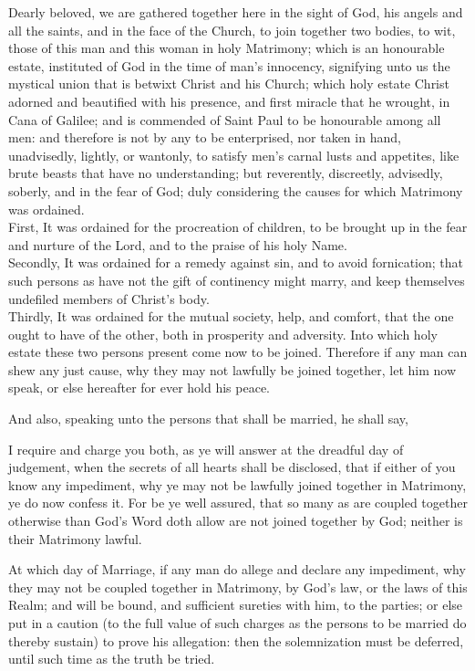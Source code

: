 Dearly beloved, we are gathered together here in the sight of God, his angels and all the saints,
and in the face of the Church, to join together two bodies, to wit, those of this man and this
woman in holy Matrimony; which is an honourable estate, instituted of God in the time of man’s
innocency, signifying unto us the mystical union that is betwixt Christ and his Church; which holy
estate Christ adorned and beautified with his presence, and first miracle that he wrought, in Cana
of Galilee; and is commended of Saint Paul to be honourable among all men: and therefore is not
by any to be enterprised, nor taken in hand, unadvisedly, lightly, or wantonly, to satisfy men’s
carnal lusts and appetites, like brute beasts that have no understanding; but reverently, discreetly,
advisedly, soberly, and in the fear of God; duly considering the causes for which Matrimony was
ordained.\\
First, It was ordained for the procreation of children, to be brought up in the fear and nurture of
the Lord, and to the praise of his holy Name.\\
Secondly, It was ordained for a remedy against sin, and to avoid fornication; that such persons as
have not the gift of continency might marry, and keep themselves undefiled members of Christ’s
body.\\
Thirdly, It was ordained for the mutual society, help, and comfort, that the one ought to have of
the other, both in prosperity and adversity. Into which holy estate these two persons present
come now to be joined. Therefore if any man can shew any just cause, why they may not lawfully
be joined together, let him now speak, or else hereafter for ever hold his peace.

\begin{rubric}
And also, speaking unto the persons that shall be married, he shall say,
\end{rubric}

I require and charge you both, as ye will answer at the dreadful day of judgement, when the secrets of all hearts shall be disclosed, that if either of you know any impediment, why ye may not be lawfully joined together in Matrimony, ye do now confess it.
For be ye well assured, that so many as are coupled together otherwise than God's Word doth allow are not joined together by God; neither is their Matrimony lawful.

\begin{rubric}
At which day of Marriage, if any man do allege and declare any impediment, why they may not be coupled together in Matrimony, by God's law, or the laws of this Realm; and will be bound, and sufficient sureties with him, to the parties; or else put in a caution (to the full value of such charges as the persons to be married do thereby sustain) to prove his allegation: then the solemnization must be deferred, until such time as the truth be tried.
\end{rubric}

